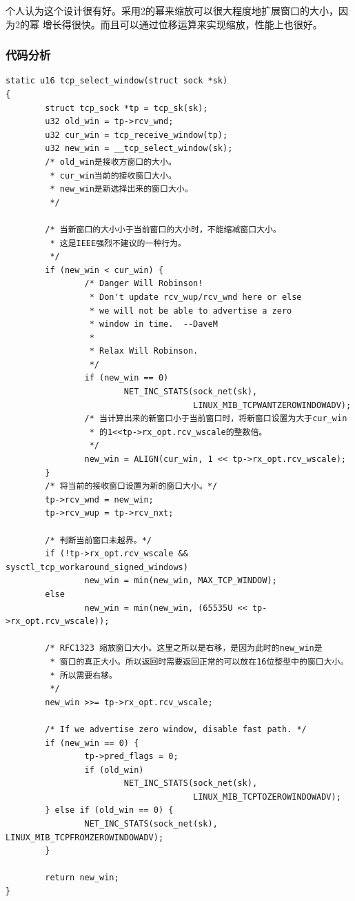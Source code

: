 \documentclass[11pt, a4paper,oneside]{book}
\theoremstyle{ocrenumbox}
\theoremstyle{purplenumbox}
\theoremstyle{blackbox}
\begin{document}
个人认为这个设计很有好。采用2的幂来缩放可以很大程度地扩展窗口的大小，因为2的幂
增长得很快。而且可以通过位移运算来实现缩放，性能上也很好。

\subsubsection{代码分析}
\begin{verbatim}
static u16 tcp_select_window(struct sock *sk)
{
        struct tcp_sock *tp = tcp_sk(sk);
        u32 old_win = tp->rcv_wnd;
        u32 cur_win = tcp_receive_window(tp);
        u32 new_win = __tcp_select_window(sk);
        /* old_win是接收方窗口的大小。
         * cur_win当前的接收窗口大小。
         * new_win是新选择出来的窗口大小。
         */

        /* 当新窗口的大小小于当前窗口的大小时，不能缩减窗口大小。
         * 这是IEEE强烈不建议的一种行为。
         */
        if (new_win < cur_win) {
                /* Danger Will Robinson!
                 * Don't update rcv_wup/rcv_wnd here or else
                 * we will not be able to advertise a zero
                 * window in time.  --DaveM
                 *
                 * Relax Will Robinson.
                 */
                if (new_win == 0)
                        NET_INC_STATS(sock_net(sk),
                                      LINUX_MIB_TCPWANTZEROWINDOWADV);
                /* 当计算出来的新窗口小于当前窗口时，将新窗口设置为大于cur_win
                 * 的1<<tp->rx_opt.rcv_wscale的整数倍。
                 */
                new_win = ALIGN(cur_win, 1 << tp->rx_opt.rcv_wscale);
        }
        /* 将当前的接收窗口设置为新的窗口大小。*/
        tp->rcv_wnd = new_win;
        tp->rcv_wup = tp->rcv_nxt;

        /* 判断当前窗口未越界。*/
        if (!tp->rx_opt.rcv_wscale && sysctl_tcp_workaround_signed_windows)
                new_win = min(new_win, MAX_TCP_WINDOW);
        else
                new_win = min(new_win, (65535U << tp->rx_opt.rcv_wscale));

        /* RFC1323 缩放窗口大小。这里之所以是右移，是因为此时的new_win是
         * 窗口的真正大小。所以返回时需要返回正常的可以放在16位整型中的窗口大小。
         * 所以需要右移。
         */
        new_win >>= tp->rx_opt.rcv_wscale;

        /* If we advertise zero window, disable fast path. */
        if (new_win == 0) {
                tp->pred_flags = 0;
                if (old_win)
                        NET_INC_STATS(sock_net(sk),
                                      LINUX_MIB_TCPTOZEROWINDOWADV);
        } else if (old_win == 0) {
                NET_INC_STATS(sock_net(sk), LINUX_MIB_TCPFROMZEROWINDOWADV);
        }

        return new_win;
}
\end{verbatim}
\end{document}
